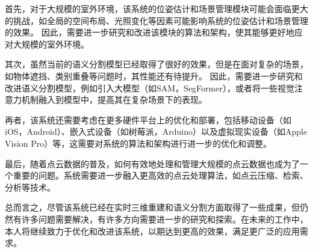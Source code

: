 \par 首先，对于大规模的室外环境，该系统的位姿估计和场景管理模块可能会面临更大的挑战，如全局的空间布局、光照变化等因素可能影响系统的位姿估计和场景管理的效果。
因此，需要进一步研究和改进该模块的算法和架构\cite{orb_slam2,loam,virtual_interest_points}，使其能够更好地应对大规模的室外环境。

\par 其次，虽然当前的语义分割模型已经取得了很好的效果，但是在面对复杂的场景，如物体遮挡、类别重叠等问题时，其性能还有待提升。
因此，需要进一步研究和改进语义分割模型，例如引入大模型（如SAM，SegFormer\cite{segformer}），或者将一些视觉注意力机制\cite{visual_attention}融入到模型中，提高其在复杂场景下的表现。

\par 再者，该系统还需要考虑在更多硬件平台上的优化和部署，包括移动设备（如iOS，Android）、嵌入式设备（如树莓派，Arduino）以及虚拟现实设备（如Apple Vision Pro）等，这需要对系统的算法和架构进行进一步的优化和调整。

\par 最后，随着点云数据的普及，如何有效地处理和管理大规模的点云数据也成为了一个重要的问题。系统需要进一步融入更高效的点云处理算法，如点云压缩、检索、分析等技术。

\par 总而言之，尽管该系统已经在实时三维重建和语义分割方面取得了一些成果，但仍然有许多问题需要解决，有许多方向需要进一步的研究和探索。在未来的工作中，本人将继续致力于优化和改进该系统，以期达到更高的效果，满足更广泛的应用需求。